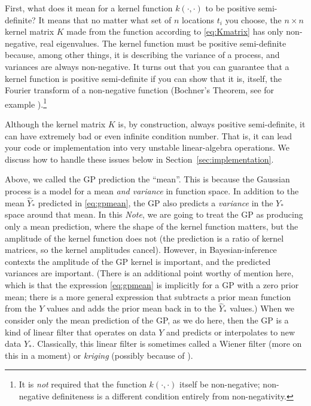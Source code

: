 \documentclass[12pt,letterpaper]{article}
\newcommand{\documentname}{\textsl{Note}}
\newcommand{\sectionname}{Section}
\begin{document}
First, what does it mean for a kernel function $k(\cdot,\cdot)$ to be positive semi-definite?
It means that no matter what set of $n$ locations $t_i$ you choose, the $n\times n$ kernel matrix $K$ made from the function according to \eqref{eq:Kmatrix} has only non-negative, real eigenvalues.
The kernel function must be positive semi-definite because, among other things, it is describing the variance of a process, and variances are always non-negative.
It turns out that you can guarantee that a kernel function is positive semi-definite if you can show that it is, itself, the Fourier transform of a non-negative function (Bochner's Theorem, see for example \citealt{folland2016course}).\footnote{It is \emph{not} required that the function $k(\cdot,\cdot)$ itself be non-negative; non-negative definiteness is a different condition entirely from non-negativity.}

Although the kernel matrix $K$ is, by construction, always positive semi-definite, it can have extremely bad or even infinite condition number. That is, it can lead your code or implementation into very unstable linear-algebra operations. We discuss how to handle these issues below in \sectionname~\ref{sec:implementation}.

Above, we called the GP prediction the ``mean''. This is because the Gaussian process is a model for a mean \emph{and variance} in function space.
In addition to the mean $\hat{Y}_\ast$ predicted in \eqref{eq:gpmean}, the GP also predicts a \emph{variance} in the $Y_\ast$ space around that mean.
In this \documentname, we are going to treat the GP as producing only a mean prediction, where the shape of the kernel function matters, but the amplitude of the kernel function does not (the prediction is a ratio of kernel matrices, so the kernel amplitudes cancel).
However, in Bayesian-inference contexts the amplitude of the GP kernel is important, and the predicted variances are important.
(There is an additional point worthy of mention here, which is that the expression \eqref{eq:gpmean} is implicitly for a GP with a zero prior mean; there is a more general expression that subtracts a prior mean function from the $Y$ values and adds the prior mean back in to the $\hat{Y}_\ast$ values.)
When we consider only the mean prediction of the GP, as we do here, then the GP is a kind of linear filter that operates on data $Y$ and predicts or interpolates to new data $Y_\ast$.
Classically, this linear filter is sometimes called a Wiener filter (more on this in a moment) or \emph{kriging} (possibly because of \citealt{krige}).
\end{document}
